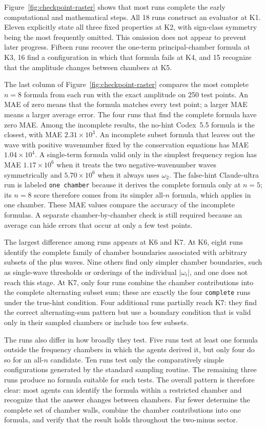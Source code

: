 \documentclass{article}
\newcommand{\outcome}[1]{\texttt{#1}}
\begin{document}
Figure~\ref{fig:checkpoint-raster} shows that most runs complete the early
computational and mathematical steps. All 18 runs construct an evaluator at
K1. Eleven explicitly state all three fixed properties at K2, with sign-class
symmetry being the most frequently omitted. This omission does not appear to
prevent later progress. Fifteen runs recover the one-term principal-chamber formula at K3,
16 find a configuration in which that formula fails at K4, and 15 recognize
that the amplitude changes between chambers at K5.

The last column of Figure~\ref{fig:checkpoint-raster} compares the most complete
$n=8$ formula from each run with the exact amplitude on 250 test points. An MAE
of zero means that the formula matches every test point; a larger MAE means a
larger average error. The four runs that find the complete formula have zero
MAE. Among the incomplete results, the no-hint Codex~5.5 formula is the closest,
with MAE $2.31\times10^3$. An incomplete subset formula that leaves out the
wave with positive wavenumber fixed by the conservation equations has MAE
$1.04\times10^4$. A single-term formula valid only in the simplest frequency
region has MAE $1.17\times10^6$ when it treats the two negative-wavenumber waves
symmetrically and $5.70\times10^6$ when it always uses $\omega_2$. The false-hint Claude-ultra
run is labeled \outcome{one chamber} because it derives the complete formula only at
$n=5$; its $n=8$ score therefore comes from its simpler all-$n$ formula, which
applies in one chamber. These MAE values compare the accuracy of the incomplete
formulas. A separate chamber-by-chamber check is still required because an
average can hide errors that occur at only a few test points.

The largest difference among runs appears at K6 and K7. At K6, eight runs identify the complete
family of chamber boundaries associated with arbitrary subsets of the plus waves. Nine
others find only simpler chamber boundaries, such as single-wave thresholds or
orderings of the individual $|\omega_i|$, and one does not reach this stage.
At K7, only four runs combine the chamber contributions into the complete
alternating subset sum; these are exactly the four \outcome{complete} runs
under the true-hint condition. Four additional runs partially reach K7: they
find the correct alternating-sum pattern but use a boundary condition that is
valid only in their sampled chambers or include too few subsets.

The runs also differ in how broadly they test. Five runs test at least one
formula outside the frequency chambers in which the agents derived it, but only
four do so for an all-$n$ candidate. Ten runs
test only the comparatively simple configurations generated by the standard
sampling routine. The remaining three runs produce no formula suitable for
such tests. The overall pattern is therefore clear: most
agents can identify the formula within a restricted chamber and recognize
that the answer changes between chambers. Far fewer determine the complete set of chamber
walls, combine the chamber contributions into one formula, and verify that
the result holds throughout the two-minus sector.
\end{document}
